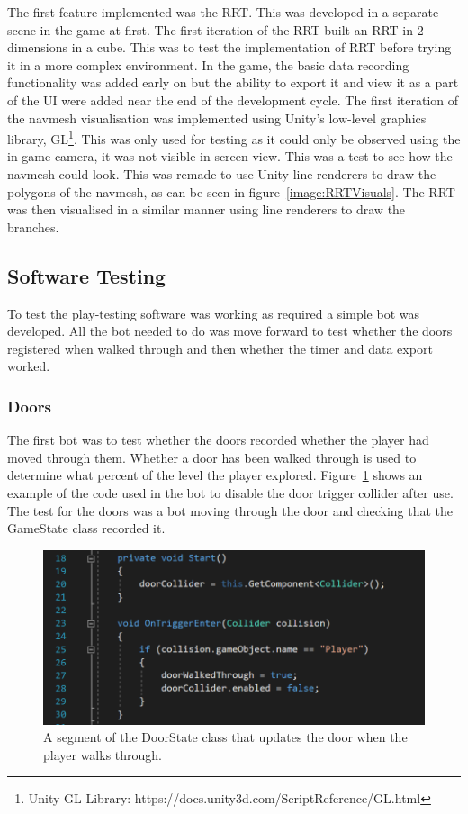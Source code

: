 \documentclass[journal]{IEEEtran}
\begin{document}
	The first feature implemented was the RRT. This was developed in a separate scene in the game at first. The first iteration of the RRT built an RRT in 2 dimensions in a cube. This was to test the implementation of RRT before trying it in a more complex environment.  In the game, the basic data recording functionality was added early on but the ability to export it and view it as a part of the UI were added near the end of the development cycle. The first iteration of the navmesh visualisation was implemented using Unity's low-level graphics library, GL\footnote[5]{Unity GL Library: https://docs.unity3d.com/ScriptReference/GL.html}. This was only used for testing as it could only be observed using the in-game camera,  it was not visible in screen view. This was a test to see how the navmesh could look. This was remade to use Unity line renderers to draw the polygons of the navmesh, as can be seen in figure~\ref{image:RRTVisuals}. The RRT was then visualised in a similar manner using line renderers to draw the branches. 
	
	\subsection{Software Testing} \label{softtest}
	To test the play-testing software was working as required a simple bot was developed. All the bot needed to do was move forward to test whether the doors registered when walked through and then whether the timer and data export worked.
	
	\subsubsection{Doors}
	The first bot was to test whether the doors recorded whether the player had moved through them. Whether a door has been walked through is used to determine what percent of the level the player explored. Figure~\ref{image:DoorCode} shows an example of the code used in the bot to disable the door trigger collider after use. The test for the doors was a bot moving through the door and checking that the GameState class recorded it.
	
	\begin{figure}[h]
		\includegraphics[width=1.0\linewidth]{DoorCode.png}
		\caption{A segment of the DoorState class that updates the door when the player walks through.}
		\label{image:DoorCode}
	\end{figure} 
	
\end{document}
